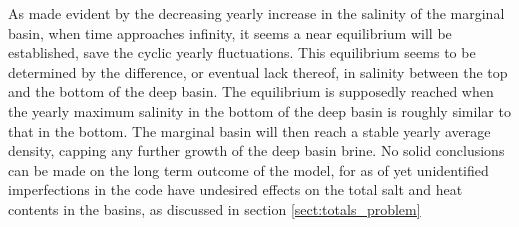 \documentclass[twocolumn]{article}
\begin{document}
As made evident by the decreasing yearly increase in the salinity of the marginal basin, when time approaches infinity, it seems a near equilibrium will be established, save the cyclic yearly fluctuations. 
This equilibrium seems to be determined by the difference, or eventual lack thereof, in salinity between the top and the bottom of the deep basin. The equilibrium is supposedly reached when the yearly maximum salinity in the bottom of the deep basin is roughly similar to that in the bottom. The marginal basin will then reach a stable yearly average density, capping any further growth of the deep basin brine. No solid conclusions can be made on the long term outcome of the model, for as of yet unidentified imperfections in the code have undesired effects on the total salt and heat contents in the basins, as discussed in section \ref{sect:totals_problem}






\end{document}
